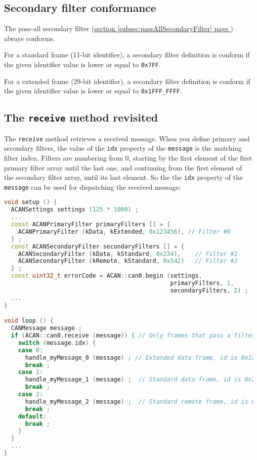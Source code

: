\documentclass[9pt, a4paper, obeyspaces, openany]{extarticle}
\newcommand \subsectionLabel[2]{\subsection{#1}\label{subsec:#2}}
\newcommand\refSubsectionPage[1]{\hyperref[subsec:#1]{section \ref*{subsec:#1} page \pageref{subsec:#1}}}
\begin{document}
\subsectionLabel{Secondary filter conformance}{secondaryFilterConformance}

The pass-all secondary filter (\refSubsectionPage{passAllSecondaryFilter}) always conforms.

For a standard frame (11-bit identifier), a secondary filter definition is conform if the given identifier value is lower or equal to \texttt{0x7FF}.

For a extended frame (29-bit identifier), a secondary filter definition is conform if the given identifier value is lower or equal to \texttt{0x1FFF\_FFFF}.




\subsectionLabel{The \texttt{receive} method revisited}{usingIDXvalueWithSecondaryFilter}

The \texttt{receive} method retrieves a received message. When you define primary and secondary filters, the value of the \texttt{idx} property of the \texttt{message} is the matching filter index. Filters are numbering from 0, starting by the first element of the first primary filter array until the last one, and continuing from the first element of the secondary filter array, until its last element. So the the \texttt{idx} property  of the \texttt{message} can be used for dispatching the received message:

{ \small\begin{lstlisting}[language=c++]
void setup () {
  ACANSettings settings (125 * 1000) ;
  ...
  const ACANPrimaryFilter primaryFilters [] = {
    ACANPrimaryFilter (kData, kExtended, 0x123456), // Filter #0
  } ;
  const ACANSecondaryFilter secondaryFilters [] = {
    ACANSecondaryFilter (kData, kStandard, 0x234),    // Filter #1
    ACANSecondaryFilter (kRemote, kStandard, 0x542)   // Filter #2
  } ;
  const uint32_t errorCode = ACAN::can0.begin (settings,
                                               primaryFilters, 1,
                                               secondaryFilters, 2) ;
  ...
}

void loop () {
  CANMessage message ;
  if (ACAN::can0.receive (message)) { // Only frames that pass a filter are retrieved
    switch (message.idx) {
    case 0:
      handle_myMessage_0 (message) ; // Extended data frame, id is 0x123456
      break ;
    case 1:
      handle_myMessage_1 (message) ;  // Standard data frame, id is 0x234
      break ;
    case 2:
      handle_myMessage_2 (message) ;  // Standard remote frame, id is 0x542
      break ;
    default:
      break ;
    }
  }
  ...
}
\end{lstlisting}}
\end{document}
